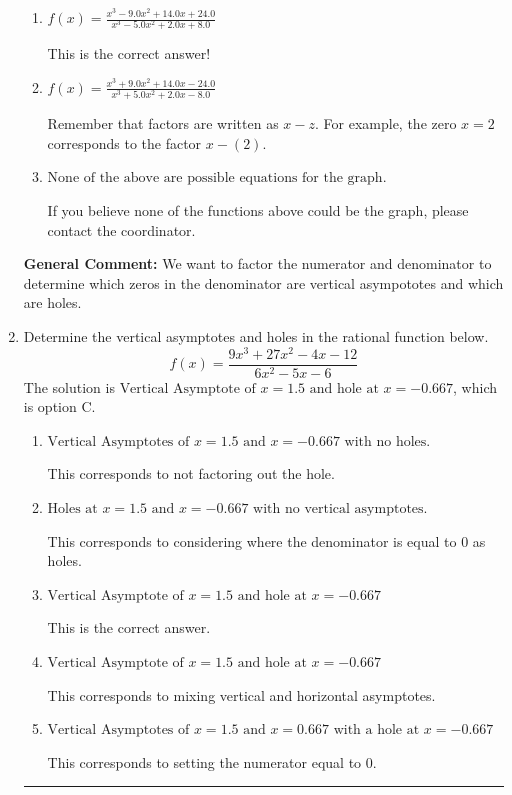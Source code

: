 \documentclass{extbook}[14pt]
\newcommand{\litem}[1]{\item #1

\rule{\textwidth}{0.4pt}}
\begin{document}
\begin{enumerate}
{\begin{enumerate}[label=\Alph*.]
You treated all of the zeros in the denominator as vertical asmptotes when some of them were holes and wrote factors as $x+z$.
\item \( f(x)=\frac{x^{3} -9.0 x^{2} +14.0 x + 24.0}{x^{3} -5.0 x^{2} +2.0 x + 8.0} \)

This is the correct answer!
\item \( f(x)=\frac{x^{3} +9.0 x^{2} +14.0 x -24.0}{x^{3} +5.0 x^{2} +2.0 x -8.0} \)

Remember that factors are written as $x-z$. For example, the zero $x=2$ corresponds to the factor $x-(2)$.
\item \( \text{None of the above are possible equations for the graph.} \)

If you believe none of the functions above could be the graph, please contact the coordinator.
\end{enumerate}

\textbf{General Comment:} We want to factor the numerator and denominator to determine which zeros in the denominator are vertical asympototes and which are holes.
}
\litem{
Determine the vertical asymptotes and holes in the rational function below.
\[ f(x) = \frac{9x^{3} +27 x^{2} -4 x -12}{6x^{2} -5 x -6} \]The solution is \( \text{Vertical Asymptote of } x = 1.5 \text{ and hole at } x = -0.667 \), which is option C.\begin{enumerate}[label=\Alph*.]
\item \( \text{Vertical Asymptotes of } x = 1.5 \text{ and } x = -0.667 \text{ with no holes.} \)

This corresponds to not factoring out the hole.
\item \( \text{Holes at } x = 1.5 \text{ and } x = -0.667 \text{ with no vertical asymptotes.} \)

This corresponds to considering where the denominator is equal to 0 as holes.
\item \( \text{Vertical Asymptote of } x = 1.5 \text{ and hole at } x = -0.667 \)

This is the correct answer.
\item \( \text{Vertical Asymptote of } x = 1.5 \text{ and hole at } x = -0.667 \)

This corresponds to mixing vertical and horizontal asymptotes.
\item \( \text{Vertical Asymptotes of } x = 1.5 \text{ and } x = 0.667 \text{ with a hole at } x = -0.667 \)

This corresponds to setting the numerator equal to 0.
\end{enumerate}

}
\end{enumerate}
\end{document}
